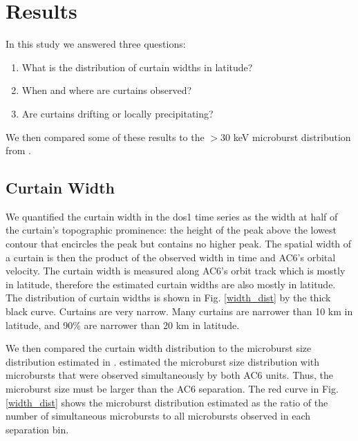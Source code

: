 \documentclass[draft]{agujournal2019}
\begin{document}
\section{Results} \label{results}
In this study we answered three questions:

\begin{enumerate}
\item What is the distribution of curtain widths in latitude?
\item When and where are curtains observed?
\item Are curtains drifting or locally precipitating?
\end{enumerate} We then compared some of these results to the $>30$ keV microburst distribution from .

\subsection{Curtain Width}
We quantified the curtain width in the dos1 time series as the width at half of the curtain's topographic prominence: the height of the peak above the lowest contour that encircles the peak but contains no higher peak. The spatial width of a curtain is then the product of the observed width in time and AC6's orbital velocity. The curtain width is measured along AC6's orbit track which is mostly in latitude, therefore the estimated curtain widths are also mostly in latitude. The distribution of curtain widths is shown in Fig. \ref{width_dist} by the thick black curve. Curtains are very narrow. Many curtains are narrower than 10 km in latitude, and 90\% are narrower than 20 km in latitude.
	
We then compared the curtain width distribution to the microburst size distribution estimated in .  estimated the microburst size distribution with microbursts that were observed simultaneously by both AC6 units. Thus, the microburst size must be larger than the AC6 separation. The red curve in Fig. \ref{width_dist} shows the microburst distribution estimated as the ratio of the number of simultaneous microbursts to all microbursts observed in each separation bin. 
\end{document}
